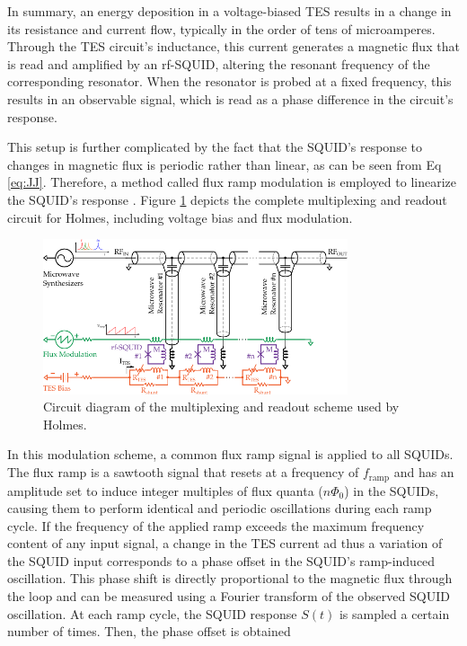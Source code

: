 In summary, an energy deposition in a voltage-biased TES results in a change in its resistance and current flow,
typically in the order of tens of microamperes. Through the TES circuit's
inductance, this current generates a magnetic flux that is read and amplified by an rf-SQUID, altering the resonant frequency of the corresponding resonator.
When the resonator is probed at a fixed frequency, this results in an observable signal, which is read as a phase difference in the circuit's response.

This setup is further complicated by the fact that the SQUID's response to changes in magnetic flux is periodic rather
than linear, as can be seen from Eq \ref{eq:JJ}. Therefore, a method called flux ramp
modulation is employed to linearize the SQUID's response \cite{mates2012flux}. Figure \ref{fig:multireadout} depicts the complete multiplexing and readout circuit for Holmes,
including voltage bias and flux modulation.
\begin{figure}[t]
  \centering
  \includegraphics[width=0.8\textwidth]{figures/ch1/HOLMEScircuit.pdf}
  \caption{Circuit diagram of the multiplexing and readout scheme used by Holmes.}
  \label{fig:multireadout}
\end{figure}
In this modulation scheme, a common flux ramp signal is applied to all SQUIDs. The flux ramp is a sawtooth signal that resets at a frequency of \(f_{\text{ramp}}\) and has an amplitude set to induce integer multiples of flux quanta (\(n\Phi_0\)) in the SQUIDs, causing them to perform identical and periodic oscillations during each ramp cycle.
If the frequency of the applied ramp exceeds the maximum frequency content of any input signal, a change in the TES
current ad thus a variation of the SQUID input corresponds to a phase offset in the SQUID's ramp-induced oscillation.
This phase shift is directly proportional to the magnetic flux through the loop and can be measured using a Fourier
transform of the observed SQUID oscillation.
At each ramp cycle, the SQUID response $S(t)$ is sampled a certain number of times. Then, the phase offset is obtained
